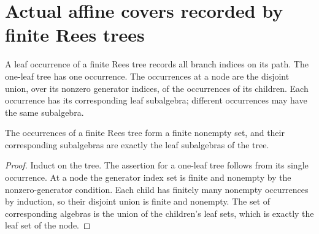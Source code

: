 \section{Actual affine covers recorded by finite Rees trees}

\begin{definition}\label{def:sc0-rees-leaf-occurrences}
\leanok
A leaf occurrence of a finite Rees tree records all branch indices on its path.
The one-leaf tree has one occurrence. The occurrences at a node are the disjoint
union, over its nonzero generator indices, of the occurrences of its children.
Each occurrence has its corresponding leaf subalgebra; different occurrences may
have the same subalgebra.
\end{definition}

\begin{lemma}\label{lem:sc0-finite-rees-leaf-occurrences}
\leanok
{}
The occurrences of a finite Rees tree form a finite nonempty set, and their
corresponding subalgebras are exactly the leaf subalgebras of the tree.
\end{lemma}
\begin{proof}
Induct on the tree. The assertion for a one-leaf tree follows from its single
occurrence. At a node the generator index set is finite and nonempty by the
nonzero-generator condition. Each child has finitely many nonempty occurrences
by induction, so their disjoint union is finite and nonempty. The set of
corresponding algebras is the union of the children's leaf sets, which is exactly
the leaf set of the node.
\end{proof}

